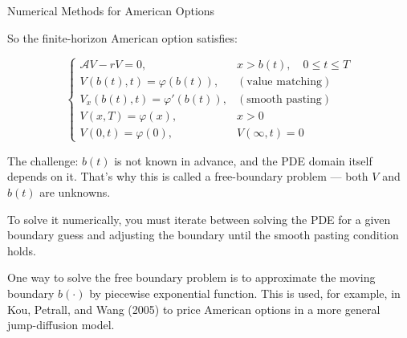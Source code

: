 \documentclass{beamer}
\begin{document}
\begin{frame}{Numerical Methods for American Options}

    {\footnotesize \footnotesize
      So the finite-horizon American option satisfies:

        \[
        \begin{cases}
        \mathcal{A} V - rV = 0, & x > b(t), \quad 0 \leq t \leq T\\
        V(b(t), t) = \varphi(b(t)), & (\text{value matching}) \\
        V_x(b(t), t) = \varphi'(b(t)), & (\text{smooth pasting}) \\
        V(x, T) = \varphi(x), & x > 0 \\
        V(0, t) = \varphi(0), & V(\infty, t) = 0
        \end{cases}
        \]
        \vspace{1em}
    \par  \pause The challenge: \( b(t) \) is not known in advance, 
    and the PDE domain itself depends on it. That's why this is called a 
    free-boundary problem — both \( V \) and \( b(t) \) are unknowns.
    \vspace{1em}

    To solve it numerically, you must iterate between solving the PDE for a given boundary guess
     and adjusting the boundary until the smooth pasting condition holds.

    \vspace{1em}
     \pause One way to solve the free boundary problem is to approximate the moving boundary \( b(\cdot) \) by piecewise exponential function. This is used, 
    for example, in Kou, Petrall, and Wang (2005) to price American options in a more general jump-diffusion model.

    }
\end{frame}
\end{document}
